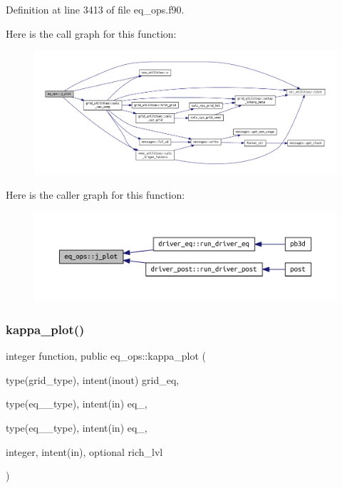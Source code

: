 Definition at line 3413 of file eq\+\_\+ops.\+f90.

Here is the call graph for this function\+:
\nopagebreak
\begin{figure}[H]
\begin{center}
\leavevmode
\includegraphics[width=350pt]{namespaceeq__ops_af611fc0c83d1ab5ed8940d9a1a652d6c_cgraph}
\end{center}
\end{figure}
Here is the caller graph for this function\+:
\nopagebreak
\begin{figure}[H]
\begin{center}
\leavevmode
\includegraphics[width=350pt]{namespaceeq__ops_af611fc0c83d1ab5ed8940d9a1a652d6c_icgraph}
\end{center}
\end{figure}
\mbox{\label{namespaceeq__ops_a9ecb744b3812fe838f13c9886307da24}} 
\subsubsection{\texorpdfstring{kappa\+\_\+plot()}{kappa\_plot()}}
{\footnotesize\ttfamily integer function, public eq\+\_\+ops\+::kappa\+\_\+plot (\begin{DoxyParamCaption}\item[{type(grid\+\_\+type), intent(inout)}]{grid\+\_\+eq,  }\item[{type(eq\+\_\+1\+\_\+type), intent(in)}]{eq\+\_,  }\item[{type(eq\+\_\+2\+\_\+type), intent(in)}]{eq\+\_,  }\item[{integer, intent(in), optional}]{rich\+\_\+lvl }\end{DoxyParamCaption})}



